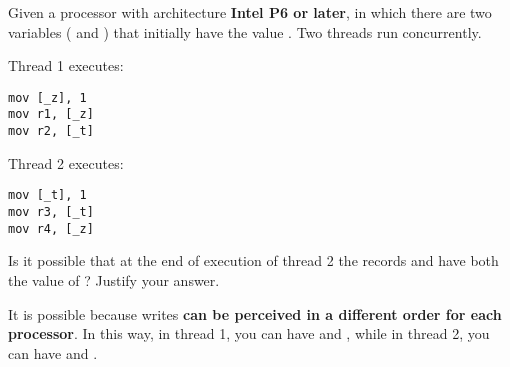 \newpage
\begin{acexercise}\end{acexercise}

Given a processor with architecture \textbf{Intel P6 or later}, in which
there are two variables ( and ) that initially have the value
. Two threads run concurrently.


Thread 1 executes:
\begin{lstlisting}[language={[x86masm]Assembler},basicstyle=\normalsize]
mov [_z], 1
mov r1, [_z]
mov r2, [_t]
\end{lstlisting}

Thread 2 executes:
\begin{lstlisting}[language={[x86masm]Assembler},basicstyle=\normalsize]
mov [_t], 1
mov r3, [_t]
mov r4, [_z]
\end{lstlisting}

Is it possible that at the end of execution of thread 2 the records  and 
have both the value of ? Justify your answer.

\begin{acsolution}\end{acsolution}

It is possible because writes \textbf{can be perceived in a different order
for each processor}. In this way, in thread 1, you can have  and
, while in thread 2, you can have  and
.
